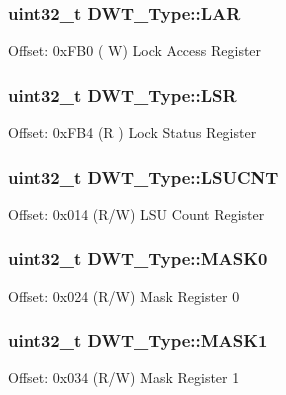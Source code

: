 \subsubsection[{\texorpdfstring{L\+AR}{LAR}}]{ uint32\+\_\+t D\+W\+T\+\_\+\+Type\+::\+L\+AR}\hypertarget{struct_d_w_t___type_a0e69531f29f71c62cccac82417cda0f8}{}\label{struct_d_w_t___type_a0e69531f29f71c62cccac82417cda0f8}
Offset\+: 0x\+F\+B0 ( W) Lock Access Register 
\subsubsection[{\texorpdfstring{L\+SR}{LSR}}]{ uint32\+\_\+t D\+W\+T\+\_\+\+Type\+::\+L\+SR}\hypertarget{struct_d_w_t___type_a28449e73e4c03e372c9ee0bb1211a58a}{}\label{struct_d_w_t___type_a28449e73e4c03e372c9ee0bb1211a58a}
Offset\+: 0x\+F\+B4 (R ) Lock Status Register 
\subsubsection[{\texorpdfstring{L\+S\+U\+C\+NT}{LSUCNT}}]{ uint32\+\_\+t D\+W\+T\+\_\+\+Type\+::\+L\+S\+U\+C\+NT}\hypertarget{struct_d_w_t___type_aeba92e6c7fd3de4ba06bfd94f47f5b35}{}\label{struct_d_w_t___type_aeba92e6c7fd3de4ba06bfd94f47f5b35}
Offset\+: 0x014 (R/W) L\+SU Count Register 
\subsubsection[{\texorpdfstring{M\+A\+S\+K0}{MASK0}}]{ uint32\+\_\+t D\+W\+T\+\_\+\+Type\+::\+M\+A\+S\+K0}\hypertarget{struct_d_w_t___type_a5bb1c17fc754180cc197b874d3d8673f}{}\label{struct_d_w_t___type_a5bb1c17fc754180cc197b874d3d8673f}
Offset\+: 0x024 (R/W) Mask Register 0 
\subsubsection[{\texorpdfstring{M\+A\+S\+K1}{MASK1}}]{ uint32\+\_\+t D\+W\+T\+\_\+\+Type\+::\+M\+A\+S\+K1}\hypertarget{struct_d_w_t___type_a0c684438a24f8c927e6e01c0e0a605ef}{}\label{struct_d_w_t___type_a0c684438a24f8c927e6e01c0e0a605ef}
Offset\+: 0x034 (R/W) Mask Register 1 
